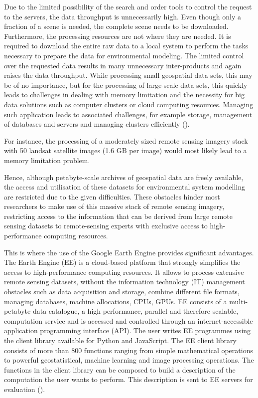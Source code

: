 Due to the limited possibility of the search and order tools to control the request to the servers, the data throughput is unnecessarily high. Even though only a fraction of a scene is needed, the complete scene needs to be downloaded. Furthermore, the processing resources are not where they are needed. It is required to download the entire raw data to a local system to perform the tasks necessary to prepare the data for environmental modeling. The limited control over the requested data results in many unnecessary inter-products and again raises the data throughput. While processing small geospatial data sets, this may be of no importance, but for the processing of large-scale data sets, this quickly leads to challenges in dealing with memory limitation and the necessity for big data solutions such as computer clusters or cloud computing resources.
Managing such application leads to associated challenges, for example storage, management of databases and servers and managing clusters efficiently (\cite{gorelick2017google}). 

For instance, the processing of a moderately sized remote sensing imagery stack with 50 landsat satellite images (1.6 GB per image) would most likely lead to a memory limitation problem.

Hence, although petabyte-scale archives of geospatial data are freely available, the access and utilisation of these datasets for environmental system modelling are restricted due to the given difficulties. 
These obstacles hinder most researchers to make use of this massive stack of remote sensing imagery, restricting access to the information that can be derived from large remote sensing datasets to remote-sensing experts with exclusive access to high-performance computing resources.

\newpage

This is where the use of the Google Earth Engine provides significant advantages.
The Earth Engine (EE) is a cloud-based platform that strongly simplifies the access to high-performance computing resources. It allows to process extensive remote sensing datasets, without the information technology (IT) management obstacles such as data acquisition and storage, combine different file formats, managing databases, machine allocations, CPUs, GPUs. 
EE consists of a multi-petabyte data catalogue, a high performance, parallel and therefore scalable, computation service and is accessed and controlled through an internet-accessible application programming interface (API). The user writes EE programmes using the client library available for Python and JavaScript.
The EE client library consists of more than 800 functions ranging from simple mathematical operations to powerful geostatistical, machine learning and image processing operations.
The functions in the client library can be composed to build a description of the computation the user wants to perform. This description is sent to EE servers for evaluation (\cite{gorelick2017google}).

